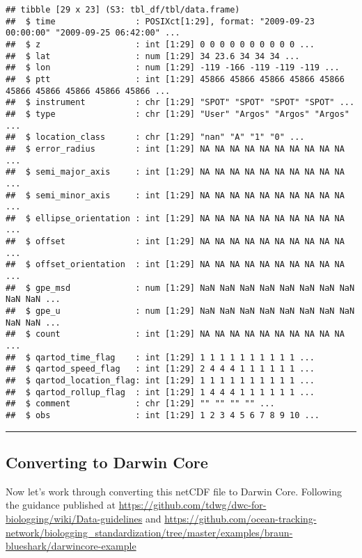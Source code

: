 \documentclass[
]{book}
\begin{document}
\begin{verbatim}
## tibble [29 x 23] (S3: tbl_df/tbl/data.frame)
##  $ time                : POSIXct[1:29], format: "2009-09-23 00:00:00" "2009-09-25 06:42:00" ...
##  $ z                   : int [1:29] 0 0 0 0 0 0 0 0 0 0 ...
##  $ lat                 : num [1:29] 34 23.6 34 34 34 ...
##  $ lon                 : num [1:29] -119 -166 -119 -119 -119 ...
##  $ ptt                 : int [1:29] 45866 45866 45866 45866 45866 45866 45866 45866 45866 45866 ...
##  $ instrument          : chr [1:29] "SPOT" "SPOT" "SPOT" "SPOT" ...
##  $ type                : chr [1:29] "User" "Argos" "Argos" "Argos" ...
##  $ location_class      : chr [1:29] "nan" "A" "1" "0" ...
##  $ error_radius        : int [1:29] NA NA NA NA NA NA NA NA NA NA ...
##  $ semi_major_axis     : int [1:29] NA NA NA NA NA NA NA NA NA NA ...
##  $ semi_minor_axis     : int [1:29] NA NA NA NA NA NA NA NA NA NA ...
##  $ ellipse_orientation : int [1:29] NA NA NA NA NA NA NA NA NA NA ...
##  $ offset              : int [1:29] NA NA NA NA NA NA NA NA NA NA ...
##  $ offset_orientation  : int [1:29] NA NA NA NA NA NA NA NA NA NA ...
##  $ gpe_msd             : num [1:29] NaN NaN NaN NaN NaN NaN NaN NaN NaN NaN ...
##  $ gpe_u               : num [1:29] NaN NaN NaN NaN NaN NaN NaN NaN NaN NaN ...
##  $ count               : int [1:29] NA NA NA NA NA NA NA NA NA NA ...
##  $ qartod_time_flag    : int [1:29] 1 1 1 1 1 1 1 1 1 1 ...
##  $ qartod_speed_flag   : int [1:29] 2 4 4 4 1 1 1 1 1 1 ...
##  $ qartod_location_flag: int [1:29] 1 1 1 1 1 1 1 1 1 1 ...
##  $ qartod_rollup_flag  : int [1:29] 1 4 4 4 1 1 1 1 1 1 ...
##  $ comment             : chr [1:29] "" "" "" "" ...
##  $ obs                 : int [1:29] 1 2 3 4 5 6 7 8 9 10 ...
\end{verbatim}

\begin{center}\rule{0.5\linewidth}{0.5pt}\end{center}

\hypertarget{converting-to-darwin-core}{%
\subsection{Converting to Darwin Core}\label{converting-to-darwin-core}}

Now let's work through converting this netCDF file to Darwin Core. Following the guidance published at \url{https://github.com/tdwg/dwc-for-biologging/wiki/Data-guidelines} and \url{https://github.com/ocean-tracking-network/biologging_standardization/tree/master/examples/braun-blueshark/darwincore-example}
\end{document}
